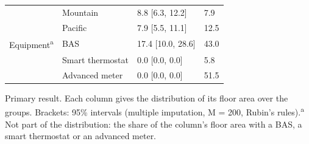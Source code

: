 \begin{table}[!htbp]
\begin{tabular}{L{2.4cm}L{3.8cm}L{3.0cm}L{1.8cm}}
 & Mountain & 8.8 [6.3, 12.2] & 7.9 \\
 & Pacific & 7.9 [5.5, 11.1] & 12.5 \\
Equipment\textsuperscript{a} & BAS & 17.4 [10.0, 28.6] & 43.0 \\
 & Smart thermostat & 0.0 [0.0, 0.0] & 5.8 \\
 & Advanced meter & 0.0 [0.0, 0.0] & 51.5 \\
\bottomrule
\end{tabular}
\par\smallskip\parbox{\textwidth}{\footnotesize Primary result. Each column gives the distribution of its floor area over the groups. Brackets: 95\% intervals (multiple imputation, M = 200, Rubin's rules).\newline \textsuperscript{a} Not part of the distribution: the share of the column's floor area with a BAS, a smart thermostat or an advanced meter.}
\end{table}
